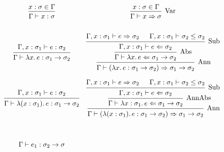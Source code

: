 \documentclass[12pt]{article}
\begin{document}
\pagestyle{empty}

\begin{align*}
    \def\arraystretch{5}
    \begin{array}{cc}
        \begin{prooftree}
            \hypo{x: \sigma \in \Gamma}
            \infer1{\Gamma \vdash x: \sigma}
        \end{prooftree}
        &
        \begin{prooftree}
            \hypo{x:\sigma \in \Gamma}
            \infer1[Var]{\Gamma \vdash x \Rightarrow \sigma}
        \end{prooftree}
        \\
        \begin{prooftree}
            \hypo{\Gamma, x: \sigma_1 \vdash e: \sigma_2}
            \infer1{\Gamma \vdash \lambda x\ldotp e: \sigma_1 \to \sigma_2}
        \end{prooftree}
        &
        \begin{prooftree}
            \hypo{\Gamma, x: \sigma_1 \vdash e \Rightarrow \sigma_2}
            \hypo{\Gamma, x: \sigma_1 \vdash \sigma_2 \leq \sigma_2}
            \infer2[Sub]{\Gamma, x: \sigma_1 \vdash e \Leftarrow \sigma_2}
            \infer1[Abs]{\Gamma \vdash \lambda x\ldotp e \Leftarrow \sigma_1 \to \sigma_2}
            \infer1[Ann]{\Gamma \vdash (\lambda x\ldotp e: \sigma_1 \to \sigma_2) \Rightarrow \sigma_1 \to \sigma_2}
        \end{prooftree}
        \\
        \begin{prooftree}
            \hypo{\Gamma, x: \sigma_1 \vdash e: \sigma_2}
            \infer1{\Gamma \vdash \lambda (x: \sigma_1)\ldotp e: \sigma_1 \to \sigma_2}
        \end{prooftree}
        &
        \begin{prooftree}
            \hypo{\Gamma, x: \sigma_1 \vdash e \Rightarrow \sigma_2}
            \hypo{\Gamma, x: \sigma_1 \vdash \sigma_2 \leq \sigma_2}
            \infer2[Sub]{\Gamma, x: \sigma_1 \vdash e \Leftarrow \sigma_2}
            \infer1[AnnAbs]{\Gamma \vdash \lambda x: \sigma_1\ldotp e \Leftarrow \sigma_1 \to \sigma_2}
            \infer1[Ann]{\Gamma \vdash (\lambda (x: \sigma_1)\ldotp e: \sigma_1 \to \sigma_2) \Rightarrow \sigma_1 \to \sigma_2}
        \end{prooftree}
        \\
        \begin{prooftree}
            \hypo{\Gamma \vdash e_1: \sigma_2 \to \sigma}

\end{prooftree}
\end{array}
\end{align*}
\end{document}
